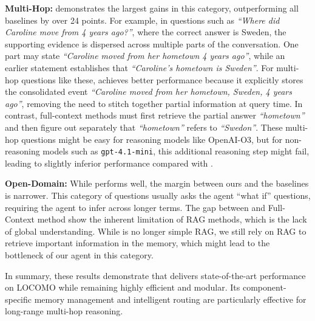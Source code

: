\textbf{Multi-Hop:} \ours demonstrates the largest gains in this category, outperforming all baselines by over 24 points. For example, in questions such as \emph{“Where did Caroline move from 4 years ago?”}, where the correct answer is Sweden, the supporting evidence is dispersed across multiple parts of the conversation. One part may state \emph{“Caroline moved from her hometown 4 years ago”}, while an earlier statement establishes that \emph{“Caroline’s hometown is Sweden”}. For multi-hop questions like these, \ours achieves better performance because it explicitly stores the consolidated event \emph{“Caroline moved from her hometown, Sweden, 4 years ago”}, removing the need to stitch together partial information at query time. In contrast, full-context methods must first retrieve the partial answer \emph{“hometown”} and then figure out separately that \emph{“hometown”}  refers to \emph{“Swedon”}. These multi-hop questions might be easy for reasoning models like OpenAI-O3, but for non-reasoning models such as \texttt{gpt-4.1-mini}, this additional reasoning step might fail, leading to slightly inferior performance compared with \ours.

\textbf{Open-Domain:} While \ours performs well, the margin between ours and the baselines is narrower. This category of questions usually asks the agent ``what if'' questions, requiring the agent to infer across longer terms. The gap between \ours and Full-Context method show the inherent limitation of RAG methods, which is the lack of global understanding. While \ours is no longer simple RAG, we still rely on RAG to retrieve important information in the memory, which might lead to the bottleneck of our agent in this category.



In summary, these results demonstrate that \ours delivers state-of-the-art performance on LOCOMO while remaining highly efficient and modular. Its component-specific memory management and intelligent routing are particularly effective for long-range multi-hop reasoning.














